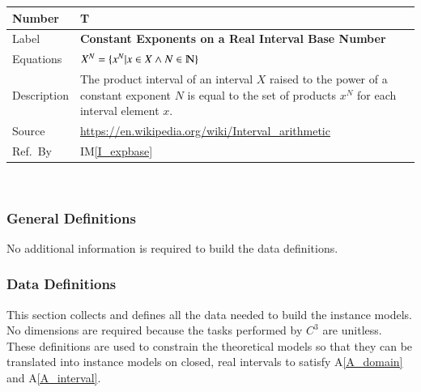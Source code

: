 \documentclass[12pt]{article}
\newcommand{\colAwidth}{0.13\textwidth}
\newcommand{\colBwidth}{0.82\textwidth}
\newcounter{theorynum} %
\newcommand{\aref}[1]{A\ref{#1}}
\newcommand{\iref}[1]{IM\ref{#1}}
\newcommand{\prognameAbbrv}{$C^{3}$}
\begin{document}
\noindent
\begin{minipage}{\textwidth}
	\renewcommand*{\arraystretch}{1.5}
	\begin{tabular}{| p{\colAwidth} | p{\colBwidth}|}
		\hline
		\rowcolor[gray]{0.9}
		Number& T{theorynum}\thetheorynum 
		\label{T_expbase}\\
		\hline
		Label&\bf Constant Exponents on a Real Interval Base 
		Number\\
		\hline
		Equations &  $X^N = \{x^N | x \in X \wedge N \in \varmathbb{N}\}$
		\\
		\hline
		Description & The product interval of an interval $X$ raised 
		to the power of a constant exponent $N$ is equal to the set of products 
		$x^N$ for each interval element $x$.\\
		\hline
		Source & \url{https://en.wikipedia.org/wiki/Interval_arithmetic}\\
		\hline
		Ref.\ By & \iref{I_expbase}\\
		\hline
	\end{tabular}
\end{minipage}\\

\subsubsection{General Definitions}
\label{sec_gendef}
No additional information is required to build the data definitions. 
\newpage
\subsubsection{Data Definitions}
\label{sec_datadef}
This section collects and defines all the data needed to build the instance
models. No dimensions are required because the tasks performed by 
\prognameAbbrv{} are unitless. These definitions are used to constrain the 
theoretical models so that they can be translated into instance models on 
closed, real intervals to satisfy \aref{A_domain} and \aref{A_interval}.

~\newline
\end{document}
